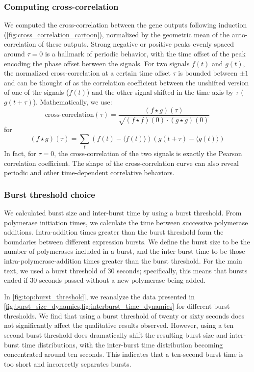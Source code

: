 \documentclass[11pt]{article}
\begin{document}
\FloatBarrier
\subsubsection{Computing cross-correlation} \label{sec:supp:cross_correlation}
We computed the cross-correlation between the gene outputs following induction (\cref{fig:cross_correlation_cartoon}), normalized by the geometric mean of the auto-correlation of these outputs.  Strong negative or positive peaks evenly spaced around \(\tau = 0\) is a hallmark of periodic behavior, with the time offset of the peak encoding the phase offset between the signals. For two signals \(f(t)\) and \(g(t)\), the normalized cross-correlation at a certain time offset \(\tau\) is bounded between \(\pm1\) and can be thought of as the correlation coefficient between the unshifted version of one of the signals (\(f(t)\)) and the other signal shifted in the time axis by \(\tau\) (\(g(t + \tau)\)). Mathematically, we use:
\begin{equation}
\text{cross-correlation}(\tau) = \frac{(f \star g)(\tau)}{\sqrt{(f \star f)(0) \cdot (g \star g)(0)}}
\end{equation}
for
\begin{equation}
    (f \star g)(\tau) = \sum_t (f(t) - \langle f(t)\rangle)(g(t+\tau) - \langle g(t)\rangle)
\end{equation}
In fact, for \(\tau = 0\), the cross-correlation of the two signals is exactly the Pearson correlation coefficient. The shape of the cross-correlation curve can also reveal periodic and other time-dependent correlative behaviors.

\subsubsection{Burst threshold choice} \label{sec:supp:burst_threshold}
We calculated burst size and inter-burst time by using a burst threshold. From polymerase initiation times, we calculate the time between successive polymerase additions. Intra-addition times greater than the burst threshold form the boundaries between different expression bursts. We define the burst size to be the number of polymerases included in a burst, and the inter-burst time to be those intra-polymerase-addition times greater than the burst threshold. For the main text, we used a burst threshold of 30 seconds; specifically, this means that bursts ended if 30 seconds passed without a new polymerase being added.

In \cref{fig:top:burst_threshold}, we reanalyze the data presented in \cref{fig:burst_size_dynamics,fig:interburst_time_dynamics} for different burst thresholds. We find that using a burst threshold of twenty or sixty seconds does not significantly affect the qualitative results observed. However, using a ten second burst threshold does dramatically shift the resulting burst size and inter-burst time distributions, with the inter-burst time distribution becoming concentrated around ten seconds. This indicates that a ten-second burst time is too short and incorrectly separates bursts.
\end{document}
